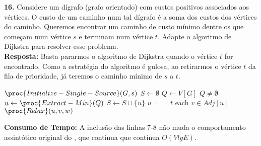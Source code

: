 
\noindent\textbf{16.} Considere um dígrafo (grafo orientado) com custos positivos associados aos vértices. O custo de um caminho num tal dígrafo é a soma dos custos dos vértices do caminho. Queremos encontrar um caminho de custo mínimo dentre os que começam num vértice $s$ e terminam num vértice $t$. Adapte o algoritmo de Dijkstra para resolver esse problema.\\[6pt]
\textbf{Resposta:} Basta pararmos o algoritmo de Dijkstra quando o vértice $t$ for encontrado. Como a estratégia do algoritmo é gulosa, ao retirarmos o vértice $t$ da fila de prioridade, já teremos o caminho mínimo de $s$ a $t$.

\begin{codebox}
\li $\proc{Initialize-Single-Source}(G, s)$
\li $S \gets \emptyset$
\li $Q \gets V[G]$
\li \While $Q \neq \emptyset$
\li \Do
        $u \gets \proc{Extract-Min}(Q)$
\li     $S \gets S \cup \{u\}$
\li     \If $u == t$
\li     \Then
            \Return
        \End
\li     \For each $v \in Adj[u]$
\li     \Do
            $\proc{Relax}(u, v, w)$
        \End
    \End
\end{codebox}

\textbf{Consumo de Tempo:} A inclusão das linhas 7-8 não muda o comportamento assintótico original do , que continua que continua $O(V lg E)$.\\[6pt]